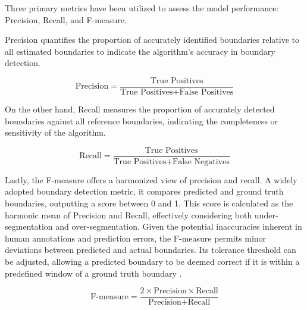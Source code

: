 Three primary metrics have been utilized to assess the model performance: Precision, Recall, and F-measure. 

Precision quantifies the proportion of accurately identified boundaries relative to all estimated boundaries to indicate the algorithm's accuracy in boundary detection.

\begin{equation}
\text{Precision} = \frac{\text{True Positives}}{\text{True Positives} + \text{False Positives}}
\end{equation}

On the other hand, Recall measures the proportion of accurately detected boundaries against all reference boundaries, indicating the completeness or sensitivity of the algorithm.

\begin{equation}
\text{Recall} = \frac{\text{True Positives}}{\text{True Positives} + \text{False Negatives}}
\end{equation}

Lastly, the F-measure offers a harmonized view of precision and recall. A widely adopted boundary detection metric, it compares predicted and ground truth boundaries, outputting a score between 0 and 1. This score is calculated as the harmonic mean of Precision and Recall, effectively considering both under-segmentation and over-segmentation. Given the potential inaccuracies inherent in human annotations and prediction errors, the F-measure permits minor deviations between predicted and actual boundaries. Its tolerance threshold can be adjusted, allowing a predicted boundary to be deemed correct if it is within a predefined window of a ground truth boundary \cite{Turnbull2007ABOOSTING, NietoPerceptualMusicb}.

\begin{equation}
\text{F-measure} = \frac{2 \times \text{Precision} \times \text{Recall}}{\text{Precision} + \text{Recall}}
\end{equation}

\newpage